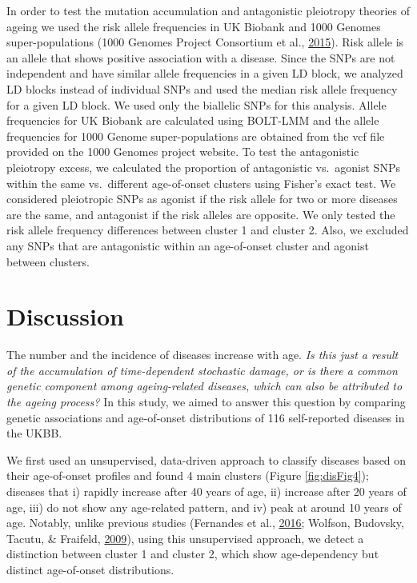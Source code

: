 \documentclass[12pt,twoside]{unicam}
\begin{document}
In order to test the mutation accumulation and antagonistic pleiotropy theories of ageing we used the risk allele frequencies in UK Biobank and 1000 Genomes super-populations (1000 Genomes Project Consortium et al., \protect\hyperlink{ref-1000_Genomes_Project_Consortium2015}{2015}). Risk allele is an allele that shows positive association with a disease. Since the SNPs are not independent and have similar allele frequencies in a given LD block, we analyzed LD blocks instead of individual SNPs and used the median risk allele frequency for a given LD block. We used only the biallelic SNPs for this analysis. Allele frequencies for UK Biobank are calculated using BOLT-LMM and the allele frequencies for 1000 Genome super-populations are obtained from the vcf file provided on the 1000 Genomes project website. To test the antagonistic pleiotropy excess, we calculated the proportion of antagonistic vs.~agonist SNPs within the same vs.~different age-of-onset clusters using Fisher's exact test. We considered pleiotropic SNPs as agonist if the risk allele for two or more diseases are the same, and antagonist if the risk alleles are opposite. We only tested the risk allele frequency differences between cluster 1 and cluster 2. Also, we excluded any SNPs that are antagonistic within an age-of-onset cluster and agonist between clusters.

\hypertarget{discussion-1}{%
\section{Discussion}\label{discussion-1}}

The number and the incidence of diseases increase with age. \emph{Is this just a result of the accumulation of time-dependent stochastic damage, or is there a common genetic component among ageing-related diseases, which can also be attributed to the ageing process?} In this study, we aimed to answer this question by comparing genetic associations and age-of-onset distributions of 116 self-reported diseases in the UKBB.

We first used an unsupervised, data-driven approach to classify diseases based on their age-of-onset profiles and found 4 main clusters (Figure \ref{fig:disFig4}); diseases that i) rapidly increase after 40 years of age, ii) increase after 20 years of age, iii) do not show any age-related pattern, and iv) peak at around 10 years of age. Notably, unlike previous studies (Fernandes et al., \protect\hyperlink{ref-Fernandes2016}{2016}; Wolfson, Budovsky, Tacutu, \& Fraifeld, \protect\hyperlink{ref-Wolfson2009}{2009}), using this unsupervised approach, we detect a distinction between cluster 1 and cluster 2, which show age-dependency but distinct age-of-onset distributions.
\end{document}
